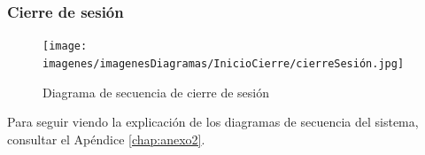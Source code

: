 \subsubsection{Cierre de sesión}

\begin{figure}[H]
	\centering
	\texttt{[image: imagenes/imagenesDiagramas/InicioCierre/cierreSesión.jpg]}
	\caption{Diagrama de secuencia de cierre de sesión}
	\label{fig:seqdiag2}
\end{figure}

Para seguir viendo la explicación de los diagramas de secuencia del sistema, consultar el Apéndice \ref{chap:anexo2}.
